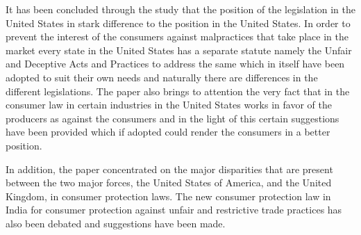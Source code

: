 \begin{multicols}{2}
\noi
It has been concluded through the study that the position of the legislation in the United States
in stark difference to the position in the United States. In order to prevent the interest of the
consumers against malpractices that take place in the market every state in the United States
has a separate statute namely the Unfair and Deceptive Acts and Practices to address the same
which in itself have been adopted to suit their own needs and naturally there are differences in
the different legislations. The paper also brings to attention the very fact that in the consumer
law in certain industries in the United States works in favor of the producers as against the
consumers and in the light of this certain suggestions have been provided which if adopted
could render the consumers in a better position.

\noi
In addition, the paper concentrated on the major disparities that are present between the two major forces, the United States of America, and the United Kingdom, in consumer protection laws. The new consumer protection law in India for consumer protection against unfair and restrictive trade practices has also been debated and suggestions have been made.
\end{multicols}

\label{end2017-art1}
